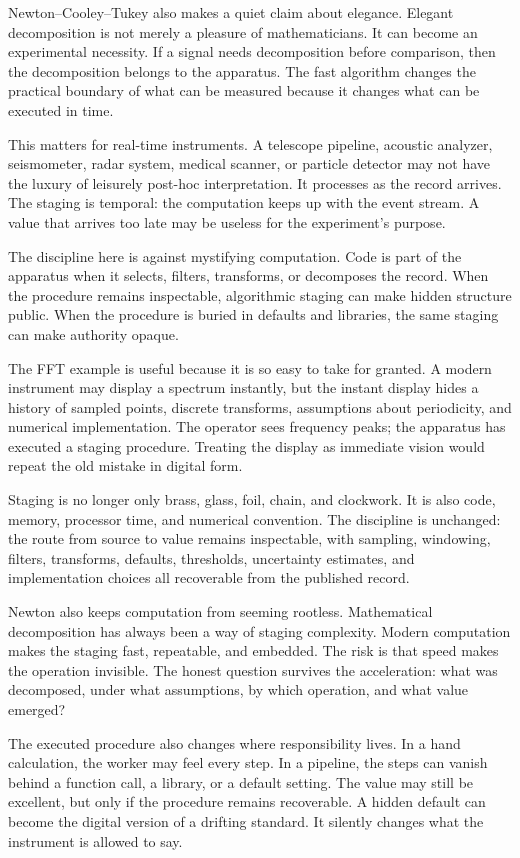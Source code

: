 Newton--Cooley--Tukey also makes a quiet claim about elegance. Elegant
decomposition is not merely a pleasure of mathematicians. It can become an
experimental necessity. If a signal needs decomposition before comparison,
then the decomposition belongs to the apparatus. The fast algorithm changes
the practical boundary of what can be measured because it changes what can
be executed in time.

This matters for real-time instruments. A telescope pipeline, acoustic
analyzer, seismometer, radar system, medical scanner, or particle detector
may not have the luxury of leisurely post-hoc interpretation. It processes
as the record arrives. The staging is temporal: the computation keeps up
with the event stream. A value that arrives too late may be useless for the
experiment's purpose.

The discipline here is against mystifying computation. Code is part of the
apparatus when it selects, filters, transforms, or decomposes the record.
When the procedure remains inspectable, algorithmic staging can make hidden
structure public. When the procedure is buried in defaults and libraries,
the same staging can make authority opaque.

The FFT example is useful because it is so easy to take for granted. A modern
instrument may display a spectrum instantly, but the instant display hides a
history of sampled points, discrete transforms, assumptions about periodicity,
and numerical implementation. The operator sees frequency peaks; the
apparatus has executed a staging procedure. Treating the display as immediate
vision would repeat the old mistake in digital form.

Staging is no longer only brass, glass, foil, chain, and clockwork. It is
also code, memory, processor time, and numerical convention. The discipline
is unchanged: the route from source to value remains inspectable, with
sampling, windowing, filters, transforms, defaults, thresholds, uncertainty
estimates, and implementation choices all recoverable from the published
record.

Newton also keeps computation from seeming rootless. Mathematical
decomposition has always been a way of staging complexity. Modern
computation makes the staging fast, repeatable, and embedded. The risk is
that speed makes the operation invisible. The honest question survives the
acceleration: what was decomposed, under what assumptions, by which
operation, and what value emerged?

The executed procedure also changes where responsibility lives. In a hand
calculation, the worker may feel every step. In a pipeline, the steps can
vanish behind a function call, a library, or a default setting. The value may
still be excellent, but only if the procedure remains recoverable. A hidden
default can become the digital version of a drifting standard. It silently
changes what the instrument is allowed to say.

